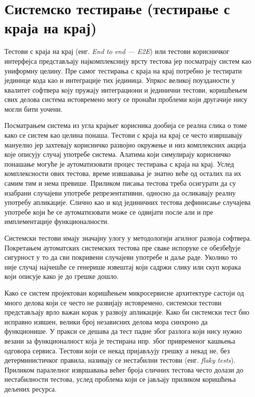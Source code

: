 \documentclass[12pt,oneside]{memoir}
\begin{document}
\section{Системско тестирање (тестирање с краја на крај)}

Тестови с краја на крај (енг.\textit{ End to end --- E2E}) или тестови корисничког интерфејса представљају најкомплекснију врсту тестова јер посматрају систем као униформну целину. Пре самог тестирања с краја на крај потребно је тестирати јединице кода као и интеграције тих јединица. Упркос великој поузданости у квалитет софтвера коју пружају интеграциони и јединични тестови, коришћењем свих делова система истовремено могу се пронаћи проблеми који другачије нису могли бити уочени.

Посматрањем система из угла крајњег корисника дообија се реална слика о томе како се систем као целина понаша. Тестови с краја на крај се често извршавају мануелно јер захтевају корисничко развојно окружење и низ комплексних акција које описују случај употребе система. Алатима који симулирају корисничко понашање могуће је аутоматизовати процес тестирања с краја на крај. Услед комплексности ових тестова, време извшавања је знатно веће од осталих па их самим тим и нема превише. Приликом писања тестова треба осигурати да су изабрани случајеви употребе репрезентативни, односно да осликавају реалну употребу апликације. Слично као и код јединичних тестова дефинисање случајева употребе који ће се аутоматизовати може се одвијати после али и пре имплементације функционалности.

Системски тестови имају значајну улогу у методологији агилног развоја софтвера. Покретањем аутоматских системских тестова пре сваке испоруке се обезбеђује сигурност у то да сви покривени случајеви употребе и даље раде. Уколико то није случај најчешће се генерише извештај који садржи слику или скуп корака који описује како је до грешке дошло.

Како се систем пројектован коришћењем микросервисне архитектуре састоји од много делова који се често не развијају истовремено, системски тестови представљају врло важан корак у развоју апликације. Како би системски тест био исправно извшен, велики број независних делова мора синхроно да функционише. У пракси се дешава да тест падне због разлога који нису нужно везани за функционалност која је тестирана нпр. због привременог кашњења одговора сервиса.  Тестови који се некад пријављују грешку а некад не, без детерминистичког правила, називају се нестабилни тестови (енг. \textit{flaky tests}). Приликом паралелног извршавања већег броја сличних тестова често долази до нестабилности тестова, услед проблема који се јављају приликом коришћења дељених ресурса.
\end{document}
